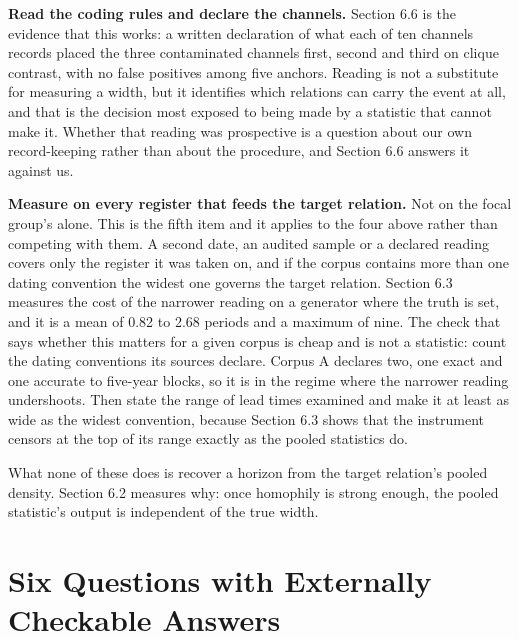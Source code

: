 \documentclass[twoside,11pt]{article}
\begin{document}
\textbf{Read the coding rules and declare the channels.} Section 6.6 is the evidence that this works: a written declaration of what each of ten channels records placed the three contaminated channels first, second and third on clique contrast, with no false positives among five anchors. Reading is not a substitute for measuring a width, but it identifies which relations can carry the event at all, and that is the decision most exposed to being made by a statistic that cannot make it. Whether that reading was prospective is a question about our own record-keeping rather than about the procedure, and Section 6.6 answers it against us.

\textbf{Measure on every register that feeds the target relation.} Not on the focal group's alone. This is the fifth item and it applies to the four above rather than competing with them. A second date, an audited sample or a declared reading covers only the register it was taken on, and if the corpus contains more than one dating convention the widest one governs the target relation. Section 6.3 measures the cost of the narrower reading on a generator where the truth is set, and it is a mean of 0.82 to 2.68 periods and a maximum of nine. The check that says whether this matters for a given corpus is cheap and is not a statistic: count the dating conventions its sources declare. Corpus A declares two, one exact and one accurate to five-year blocks, so it is in the regime where the narrower reading undershoots. Then state the range of lead times examined and make it at least as wide as the widest convention, because Section 6.3 shows that the instrument censors at the top of its range exactly as the pooled statistics do.

What none of these does is recover a horizon from the target relation's pooled density. Section 6.2 measures why: once homophily is strong enough, the pooled statistic's output is independent of the true width.

\section{Six Questions with Externally Checkable Answers}
\end{document}
